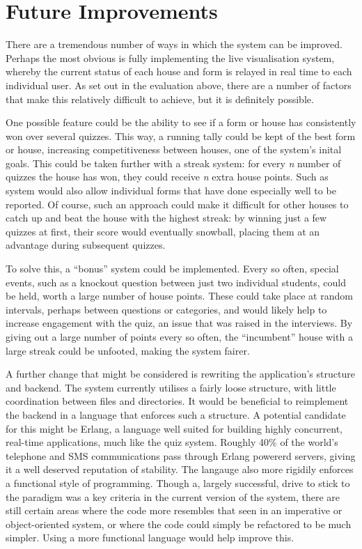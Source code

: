 \section{Future Improvements} %
\label{sec:future_improvements}

There are a tremendous number of ways in which the system can be improved. Perhaps the most obvious is fully implementing the live visualisation system, whereby the current status of each house and form is relayed in real time to each individual user. As set out in the evaluation above, there are a number of factors that make this relatively difficult to achieve, but it is definitely possible.

One possible feature could be the ability to see if a form or house has consistently won over several quizzes. This way, a running tally could be kept of the best form or house, increasing competitiveness between houses, one of the system's inital goals. This could be taken further with a streak system: for every \textit{n} number of quizzes the house has won, they could receive \textit{n} extra house points. Such as system would also allow individual forms that have done especially well to be reported. Of course, such an approach could make it difficult for other houses to catch up and beat the house with the highest streak: by winning just a few quizzes at first, their score would eventually snowball, placing them at an advantage during subsequent quizzes.

To solve this, a ``bonus'' system could be implemented. Every so often, special events, such as a knockout question between just two individual students, could be held, worth a large number of house points. These could take place at random intervals, perhaps between questions or categories, and would likely help to increase engagement with the quiz, an issue that was raised in the interviews. By giving out a large number of points every so often, the ``incumbent'' house with a large streak could be unfooted, making the system fairer.

A further change that might be considered is rewriting the application's structure and backend. The system currently utilises a fairly loose structure, with little coordination between files and directories. It would be beneficial to reimplement the backend in a language that enforces such a structure. A potential candidate for this might be Erlang, a language well suited for building highly concurrent, real-time applications, much like the quiz system. Roughly 40\% of the world's telephone and SMS communications pass through Erlang powererd servers, giving it a well deserved reputation of stability. The langauge also more rigidily enforces a functional style of programming. Though a, largely successful, drive to stick to the paradigm was a key criteria in the current version of the system, there are still certain areas where the code more resembles that seen in an imperative or object-oriented system, or where the code could simply be refactored to be much simpler. Using a more functional language would help improve this.

